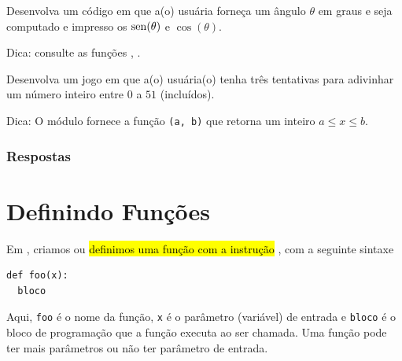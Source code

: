 \begin{exer}
  Desenvolva um código em que a(o) usuária forneça um ângulo $\theta$ em graus e seja computado e impresso os $\operatorname{sen}(\theta)$ e $\cos(\theta)$.
\end{exer}
\begin{resp}
  Dica: consulte as funções {\PYTHONmathDOTsin}, {\PYTHONmathDOTcos}.
\end{resp}

\begin{exer}
  Desenvolva um jogo em que a(o) usuária(o) tenha três tentativas para adivinhar um número inteiro entre $0$ a $51$ (incluídos). 
\end{exer}
\begin{resp}
  Dica: O módulo {\PYTHONrandom} fornece a função {\PYTHONrandomDOTrandint}\texttt{(a, b)} que retorna um inteiro $a \leq x \leq b$.
\end{resp}

\ifisbook
\subsubsection{Respostas}
\shipoutAnswer
\fi

\section{Definindo Funções}\label{cap_fun_sec_def}

Em {\python}, criamos ou \hl{definimos uma função com a instrução {\PYTHONdef}}, com a seguinte sintaxe

\begin{lstlisting}
def foo(x):
  bloco
\end{lstlisting}

Aqui, \lstinline+foo+ é o nome da função, \lstinline+x+ é o parâmetro (variável) de entrada e \lstinline+bloco+ é o bloco de programação que a função executa ao ser chamada. Uma função pode ter mais parâmetros ou não ter parâmetro de entrada.

